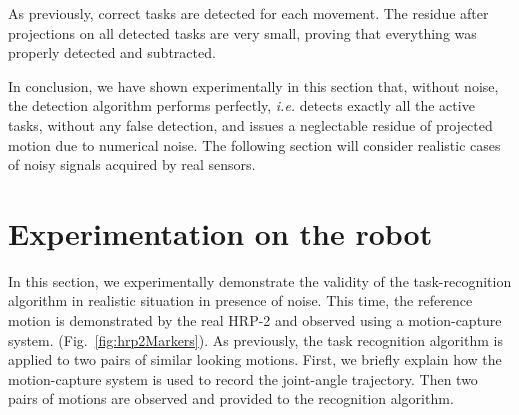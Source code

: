 \documentclass[journal]{IEEEtran}
\begin{document}
As previously, correct tasks are detected for each movement. The residue after projections on all detected
tasks are very small, proving that everything was properly detected and subtracted.

In conclusion, we have shown experimentally in this section that, without noise, the detection algorithm
performs perfectly, \emph{i.e.} detects exactly all the active tasks, without any  false detection,
and issues a neglectable residue of projected motion due to numerical noise. The following section will consider
realistic cases of noisy signals acquired by real sensors.

\section{Experimentation on the robot}
\label{sec:real}
In this section, we experimentally demonstrate the validity of the task-recognition algorithm
in realistic situation in presence of noise. This time, the reference motion 
is demonstrated by the real HRP-2 and observed 
using a motion-capture system. (Fig.~\ref{fig:hrp2Markers}).
As previously, the task recognition algorithm is applied to two pairs of similar looking motions.
First, we briefly explain how the motion-capture system is used to record the joint-angle 
trajectory. Then two pairs of motions are observed and provided to the recognition algorithm.
\end{document}
